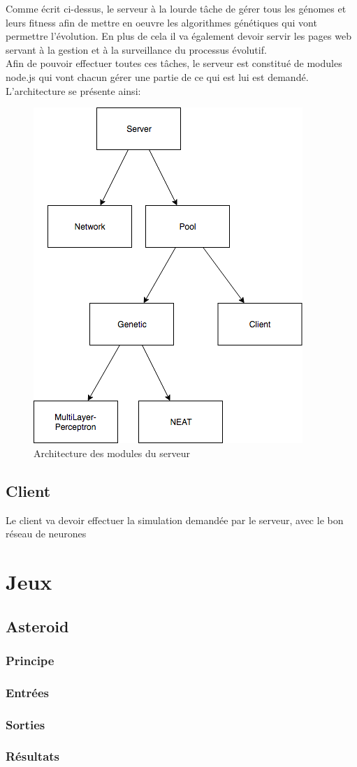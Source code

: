 \documentclass{article}
\begin{document}
Comme écrit ci-dessus, le serveur à la lourde tâche de gérer tous les génomes et leurs fitness afin de mettre en oeuvre les algorithmes génétiques qui vont permettre l'évolution. En plus de cela il va également devoir servir les pages web servant à la gestion et à la surveillance du processus évolutif.\\
Afin de pouvoir effectuer toutes ces tâches, le serveur est constitué de modules node.js qui vont chacun gérer une partie de ce qui est lui est demandé.\\
L'architecture se présente ainsi:
\begin{figure}[h]
\begin{center}
	\includegraphics[scale=0.5]{"server.png"} 
	\caption{Architecture des modules du serveur}
\end{center}
\end{figure}
\newpage

\subsection{Client}

Le client va devoir effectuer la simulation demandée par le serveur, avec le bon réseau de neurones


\section{Jeux}
\subsection{Asteroid}
\subsubsection{Principe}
\subsubsection{Entrées}
\subsubsection{Sorties}
\subsubsection{Résultats}



\end{document}
